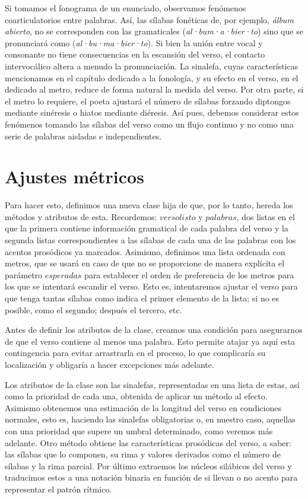 Si tomamos el fonograma de un enunciado, observamos fenómenos coarticulatorios entre palabras. Así, las sílabas fonéticas de, por ejemplo, \textit{álbum abierto}, no se corresponden con las gramaticales (\textit{al·bum·a·bier·to}) sino que se pronunciará como (\textit{al·bu·ma·bier·to}). Si bien la unión entre vocal y consonante no tiene consecuencias en la escansión del verso, el contacto intervocálico altera a menudo la pronunciación. La sinalefa, cuyas características mencionamos en el capítulo dedicado a la fonología, y su efecto en el verso, en el dedicado al metro, reduce de forma natural la medida del verso. Por otra parte, si el metro lo requiere, el poeta ajustará el número de sílabas forzando diptongos mediante sinéresis o hiatos mediante diéresis. Así pues, debemos considerar estos fenómenos tomando las sílabas del verso como un flujo continuo y no como una serie de palabras aisladas e independientes.

\section{Ajustes métricos}
Para hacer esto, definimos una nueva clase \MetroVerso hija de \Frase que, por lo tanto, hereda los métodos y atributos de esta. Recordemos: $versolisto$ y $palabras$, dos listas en el que la primera contiene información gramatical de cada palabra del verso y la segunda listas correspondientes a las sílabas de cada una de las palabras con los acentos prosódicos ya marcados. Asimismo, definimos una lista ordenada con metros, que se usará en caso de que no se proporcione de manera explícita el parámetro $esperadas$ para establecer el orden de preferencia de los metros para los que se intentará escandir el verso. Esto es, intentaremos ajustar el verso para que tenga tantas sílabas como indica el primer elemento de la lista; si no es posible, como el segundo; después el tercero, etc.

Antes de definir los atributos de la clase, creamos una condición para asegurarnos de que el verso contiene al menos una palabra. Esto permite atajar ya aquí esta contingencia para evitar arrastrarla en el proceso, lo que complicaría su localización y obligaría a hacer excepciones más adelante.

Los atributos de la clase son las sinalefas, representadas en una lista de estas, así como la prioridad de cada una, obtenida de aplicar un método al efecto. Asimismo obtenemos una estimación de la longitud del verso en condiciones normales, esto es, haciendo las sinalefas obligatorias o, en nuestro caso, aquellas con una prioridad que supere un umbral determinado, como veremos más adelante. Otro método obtiene las características prosódicas del verso, a saber: las sílabas que lo componen, su rima y valores derivados como el número de sílabas y la rima parcial. Por último extraemos los núcleos silábicos del verso y traducimos estos a una notación binaria en función de si llevan o no acento para representar el patrón rítmico.

